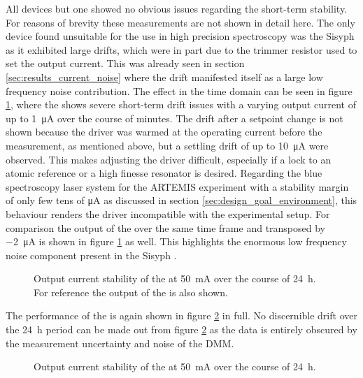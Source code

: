 All devices but one showed no obvious issues regarding the short-term stability. For reasons of brevity these measurements are not shown in detail here. The only device found unsuitable for the use in high precision spectroscopy was the Sisyph  as it exhibited large drifts, which were in part due to the trimmer resistor used to set the output current. This was already seen in section \ref{sec:results_current_noise} where the drift manifested itself as a large low frequency noise contribution. The effect in the time domain can be seen in figure \ref{fig:stability_smc11}, where the  shows severe short-term drift issues with a varying output current of up to \qty{1}{\uA} over the course of minutes. The drift after a setpoint change is not shown because the driver was warmed at the operating current before the measurement, as mentioned above, but a settling drift of up to \qty{10}{\uA} were observed. This makes adjusting the driver difficult, especially if a lock to an atomic reference or a high finesse resonator is desired. Regarding the blue spectroscopy laser system for the ARTEMIS experiment with a stability margin of only few tens of \unit{\uA} as discussed in section \ref{sec:design_goal_environment}, this behaviour renders the driver incompatible with the experimental setup. For comparison the output of the  over the same time frame and transposed by \qty{-2}{\uA} is shown in figure \ref{fig:stability_smc11} as well. This highlights the enormous low frequency noise component present in the Sisyph .
\begin{figure}[ht]
    \centering
    \caption{Output current stability of the  at \qty{50}{\mA} over the course of \qty{24}{\hour}. For reference the output of the  is also shown.}
    \label{fig:stability_smc11}
\end{figure}

The performance of the  is again shown in figure \ref{fig:stability_dgDrive} in full. No discernible drift over the \qty{24}{\hour} period can be made out from figure \ref{fig:stability_dgDrive} as the data is entirely obscured by the measurement uncertainty and noise of the  DMM.
\begin{figure}[h!]
    \centering
    \caption{Output current stability of the  at \qty{50}{\mA} over the course of \qty{24}{\hour}.}
    \label{fig:stability_dgDrive}
\end{figure}


